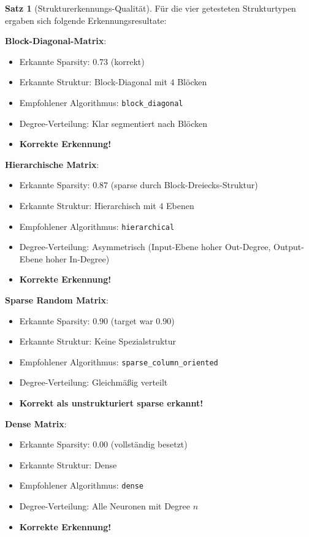 \documentclass[a4paper,12pt]{report}
\theoremstyle{definition}
\newtheorem{satz}{Satz}
\begin{document}
	\begin{satz}[Strukturerkennungs-Qualität]
		Für die vier getesteten Strukturtypen ergaben sich folgende Erkennungsresultate:
		
		\textbf{Block-Diagonal-Matrix}:
		\begin{itemize}
			\item Erkannte Sparsity: $0.73$ (korrekt)
			\item Erkannte Struktur: Block-Diagonal mit $4$ Blöcken
			\item Empfohlener Algorithmus: \texttt{block\_diagonal}
			\item Degree-Verteilung: Klar segmentiert nach Blöcken
			\item \textbf{Korrekte Erkennung!}
		\end{itemize}
		
		\textbf{Hierarchische Matrix}:
		\begin{itemize}
			\item Erkannte Sparsity: $0.87$ (sparse durch Block-Dreiecks-Struktur)
			\item Erkannte Struktur: Hierarchisch mit $4$ Ebenen
			\item Empfohlener Algorithmus: \texttt{hierarchical}
			\item Degree-Verteilung: Asymmetrisch (Input-Ebene hoher Out-Degree, Output-Ebene hoher In-Degree)
			\item \textbf{Korrekte Erkennung!}
		\end{itemize}
		
		\textbf{Sparse Random Matrix}:
		\begin{itemize}
			\item Erkannte Sparsity: $0.90$ (target war 0.90)
			\item Erkannte Struktur: Keine Spezialstruktur
			\item Empfohlener Algorithmus: \texttt{sparse\_column\_oriented}
			\item Degree-Verteilung: Gleichmäßig verteilt
			\item \textbf{Korrekt als unstrukturiert sparse erkannt!}
		\end{itemize}
		
		\textbf{Dense Matrix}:
		\begin{itemize}
			\item Erkannte Sparsity: $0.00$ (vollständig besetzt)
			\item Erkannte Struktur: Dense
			\item Empfohlener Algorithmus: \texttt{dense}
			\item Degree-Verteilung: Alle Neuronen mit Degree $n$
			\item \textbf{Korrekte Erkennung!}
		\end{itemize}
	\end{satz}
	
\end{document}
